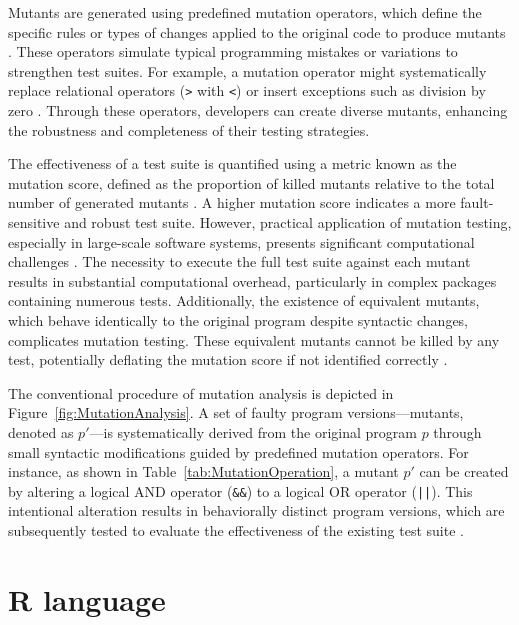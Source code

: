 Mutants are generated using predefined mutation operators, which define the specific rules or types of changes applied to the original code to produce mutants \cite{offutt1996practical}. These operators simulate typical programming mistakes or variations to strengthen test suites. For example, a mutation operator might systematically replace relational operators (\texttt{>} with \texttt{<}) or insert exceptions such as division by zero \cite{jia2011analysis}. Through these operators, developers can create diverse mutants, enhancing the robustness and completeness of their testing strategies.

The effectiveness of a test suite is quantified using a metric known as the mutation score, defined as the proportion of killed mutants relative to the total number of generated mutants \cite{jia2011analysis}. A higher mutation score indicates a more fault-sensitive and robust test suite. However, practical application of mutation testing, especially in large-scale software systems, presents significant computational challenges \cite{petrovic2018industrial}. The necessity to execute the full test suite against each mutant results in substantial computational overhead, particularly in complex packages containing numerous tests. Additionally, the existence of equivalent mutants, which behave identically to the original program despite syntactic changes, complicates mutation testing. These equivalent mutants cannot be killed by any test, potentially deflating the mutation score if not identified correctly \cite{offutt1996practical}.

The conventional procedure of mutation analysis is depicted in Figure~\ref{fig:MutationAnalysis}. A set of faulty program versions—mutants, denoted as \( p' \)—is systematically derived from the original program \( p \) through small syntactic modifications guided by predefined mutation operators. For instance, as shown in Table~\ref{tab:MutationOperation}, a mutant \( p' \) can be created by altering a logical AND operator (\texttt{\&\&}) to a logical OR operator (\texttt{||}). This intentional alteration results in behaviorally distinct program versions, which are subsequently tested to evaluate the effectiveness of the existing test suite \cite{jia2011analysis}.


\section{R language}

